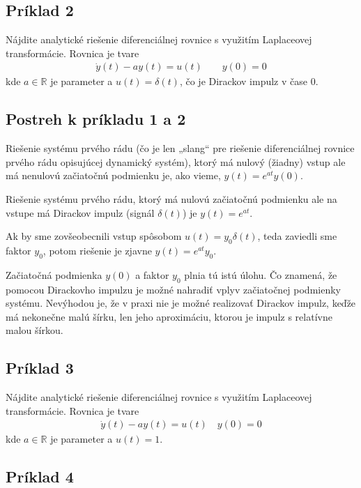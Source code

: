 \documentclass[a4paper, 10pt, ]{article}
\begin{document}
\subsection{Príklad 2}
\label{s1pr2}

Nájdite analytické riešenie diferenciálnej rovnice s využitím Laplaceovej transformácie. Rovnica je tvare
\begin{align}
    \dot y(t) - a y(t) = u(t) \qquad y(0) = 0
\end{align}
kde $a \in \mathbb R$ je parameter a $u(t) = \delta(t)$, čo je Dirackov impulz v čase $0$.



\subsection{Postreh k príkladu 1 a 2}

Riešenie systému prvého rádu (čo je len „slang“ pre riešenie diferenciálnej rovnice prvého rádu opisujúcej dynamický systém), ktorý má nulový (žiadny) vstup ale má nenulovú začiatočnú podmienku je, ako vieme, $y(t) = e^{at} y(0)$.

Riešenie systému prvého rádu, ktorý má nulovú začiatočnú podmienku ale na vstupe má Dirackov impulz (signál $\delta(t)$) je $y(t) = e^{at}$.

Ak by sme zovšeobecnili vstup spôsobom $u(t) = y_0 \delta(t)$, teda zaviedli sme faktor $y_0$, potom riešenie je zjavne $y(t) = e^{at} y_0 $. 

Začiatočná podmienka $y(0)$ a faktor $y_0$ plnia tú istú úlohu. Čo znamená, že pomocou Dirackovho impulzu je možné nahradiť vplyv začiatočnej podmienky systému. Nevýhodou je, že v praxi nie je možné realizovať Dirackov impulz, keďže má nekonečne malú šírku, len jeho aproximáciu, ktorou je impulz s relatívne malou šírkou.




\subsection{Príklad 3}
\label{s1pr3}

Nájdite analytické riešenie diferenciálnej rovnice s využitím Laplaceovej transformácie. Rovnica je tvare
\begin{align}
    \dot y(t) - a y(t) = u(t) \quad y(0) = 0
\end{align}
kde $a \in \mathbb R$ je parameter a $u(t) = 1$.




\subsection{Príklad 4}
\end{document}

